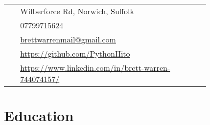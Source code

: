 \documentclass[10pt]{article} %
\begin{document}
\begin{paracol}{2}
\parbox[top][0.12\textheight][c]{\linewidth}{ %
	\vspace{-0.04\textheight} %
	\colorbox{shade}{ %
		\begin{supertabular}{p{0.05\linewidth}|p{0.775\linewidth}} %
			\raisebox{-1pt}{\faHome} & Wilberforce Rd, Norwich, Suffolk \\ %
			\raisebox{-1pt}{\faPhone} & 07799715624 \\ %
			\raisebox{0pt}{\small\faEnvelope} & \href{mailto:brettwarrenmail@gmail.com}{brettwarrenmail@gmail.com} \\ %
			\raisebox{-1pt}{\faGithub} & \href{https://github.com/PythonHito}{https://github.com/PythonHito} \\ %
			\raisebox{-1pt}{\faLinkedinSquare} & \href{https://www.linkedin.com/in/brett-warren-744074157/}{https://www.linkedin.com/in/brett-warren-744074157/} \\ %
		\end{supertabular}
	}
}


\section{Education} 





\begin{supertabular}{rl} %


\end{supertabular}
\end{paracol}
\end{document}

